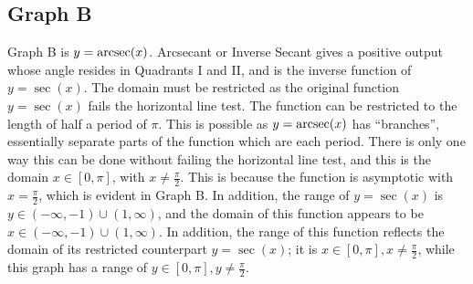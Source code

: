 \subsection{Graph B}

Graph B is $y=\operatorname{arcsec}(x)$.
Arcsecant or Inverse Secant gives a positive output whose angle resides in Quadrants I and II, and is the inverse function of $y=\sec(x)$.
The domain must be restricted as the original function $y=\sec(x)$ fails the horizontal line test.
The function can be restricted to the length of half a period of $\pi$.
This is possible as $y=\operatorname{arcsec}(x)$ has “branches”, essentially separate parts of the function which are each period.
There is only one way this can be done without failing the horizontal line test, and this is the domain $x \in{[0,\pi]}$, with ${x \neq \frac{\pi}{2}}$.
This is because the function is asymptotic with $x=\frac{\pi}{2}$, which is evident in Graph B.
In addition, the range of $y=\sec(x)$ is $y \in {{({-\infty}, {-1})} \cup {(1, {\infty})}}$, and the domain of this function appears to be $x \in {{({-\infty}, {-1})} \cup {(1, {\infty})}}$.
In addition, the range of this function reflects the domain of its restricted counterpart $y=\sec(x)$; it is ${x \in {[0, \pi]}}, {x \neq \frac{\pi}{2}}$, while this graph has a range of ${y \in {[0, \pi]}}, {y \neq \frac{\pi}{2}}$.
